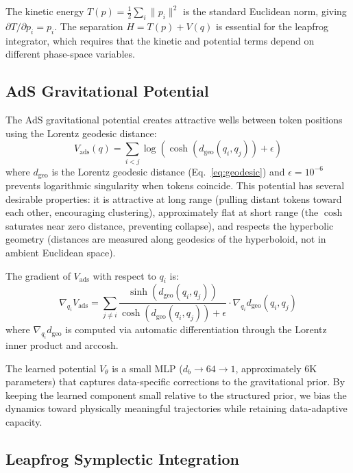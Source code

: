 \documentclass[11pt,a4paper,twocolumn]{article}
\begin{document}
The kinetic energy $T(p) = \frac{1}{2}\sum_i \|p_i\|^2$ is the standard Euclidean norm, giving $\partial T/\partial p_i = p_i$.
The separation $H = T(p) + V(q)$ is essential for the leapfrog integrator, which requires that the kinetic and potential terms depend on different phase-space variables.

\subsection{AdS Gravitational Potential}

The AdS gravitational potential creates attractive wells between token positions using the Lorentz geodesic distance:
\begin{equation}
V_{\mathrm{ads}}(q) = \sum_{i < j} \log\!\left(\cosh\!\left(d_{\mathrm{geo}}(q_i, q_j)\right) + \epsilon\right)
\label{eq:vads}
\end{equation}
where $d_{\mathrm{geo}}$ is the Lorentz geodesic distance (Eq.~\ref{eq:geodesic}) and $\epsilon = 10^{-6}$ prevents logarithmic singularity when tokens coincide.
This potential has several desirable properties: it is attractive at long range (pulling distant tokens toward each other, encouraging clustering), approximately flat at short range (the $\cosh$ saturates near zero distance, preventing collapse), and respects the hyperbolic geometry (distances are measured along geodesics of the hyperboloid, not in ambient Euclidean space).

The gradient of $V_{\mathrm{ads}}$ with respect to $q_i$ is:
\begin{equation}
\nabla_{q_i} V_{\mathrm{ads}} = \sum_{j \neq i} \frac{\sinh(d_{\mathrm{geo}}(q_i,q_j))}{\cosh(d_{\mathrm{geo}}(q_i,q_j)) + \epsilon} \cdot \nabla_{q_i} d_{\mathrm{geo}}(q_i,q_j)
\label{eq:vads_grad}
\end{equation}
where $\nabla_{q_i} d_{\mathrm{geo}}$ is computed via automatic differentiation through the Lorentz inner product and arccosh.

The learned potential $V_\theta$ is a small MLP ($d_b \to 64 \to 1$, approximately 6K parameters) that captures data-specific corrections to the gravitational prior.
By keeping the learned component small relative to the structured prior, we bias the dynamics toward physically meaningful trajectories while retaining data-adaptive capacity.

\subsection{Leapfrog Symplectic Integration}
\end{document}
